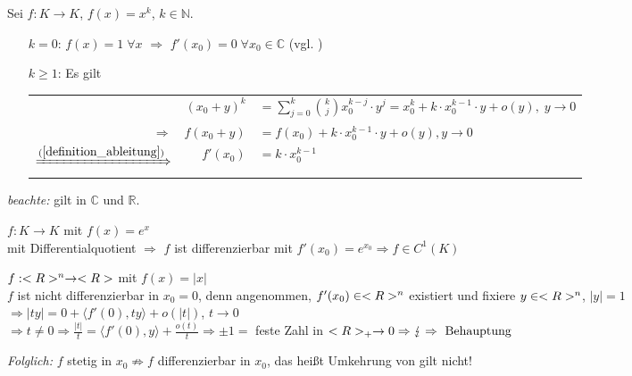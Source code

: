 \begin{example}
	Sei $f:K\to K$, $f(x) = x^k$, $k\in\mathbb{N}$.
	\begin{itemize}[leftmargin=]
		\item[$k=0$:] $f(x) = 1\;\forall x$ $\Rightarrow$ $f'(x_0) = 0\;\forall x_0\in\mathbb{C}$ (vgl. )
		\item[$k\ge 1$:] Es gilt \\
		\renewcommand{\arraystretch}{1.2}
		\begin{tabularx}{\linewidth}{r@{\ \ }r@{$\,$}X}
			& $(x_0 + y)^k$ & $\displaystyle = \sum_{j=0}^{k}\binom{k}{j} x_0^{k-j}\cdot y^j = x_0^k + k\cdot x_0^{k-1}\cdot y + o(y),\;y\to 0$ \\
			$\Rightarrow$ & $f(x_0 + y)$ & $= f(x_0) + k\cdot x_0^{k-1}\cdot y + o(y), y\to 0$ \\
			$\xRightarrow{(\ref{definition_ableitung})}$ & $f'(x_0)$ & $= k\cdot x_0^{k-1}$
		\end{tabularx}
	\end{itemize}
	\emph{beachte:} gilt in $\mathbb{C}$ und $\mathbb{R}$.
\end{example}

\begin{example}[Exponentialfunktion]
	$f:K\to K$ mit $f(x)=e^x$ \\
	mit Differentialquotient $\Rightarrow$ $f$ ist differenzierbar mit $f'(x_0)=e^{x_0}\Rightarrow f\in C^1(K)$
\end{example}

\begin{example}[Betragsfunktion]
	$f:<R>^n\to <R>$ mit $f(x)=\vert x\vert$ \\
	$f$ ist nicht differenzierbar in $x_0=0$, denn angenommen, $f'(x_0)\in<R>^n$ existiert und fixiere $y\in<R>^n$, $\vert y\vert=1$ \\
	$\Rightarrow \vert ty\vert=0+\langle f'(0),ty\rangle + o(\vert t\vert)$, $t\to 0$ \\
	$\Rightarrow t\neq 0\Rightarrow \frac{\vert t\vert}{t}=\langle f'(0),y\rangle+\frac{o(t)}{t}\Rightarrow\pm 1 =$ feste Zahl in $<R>_+\to 0\Rightarrow\lightning\Rightarrow \text{ Behauptung}$
	
	\emph{Folglich:} $f$ stetig in $x_0\not\Rightarrow f$ differenzierbar in $x_0$, das heißt Umkehrung von  gilt nicht!
\end{example}

